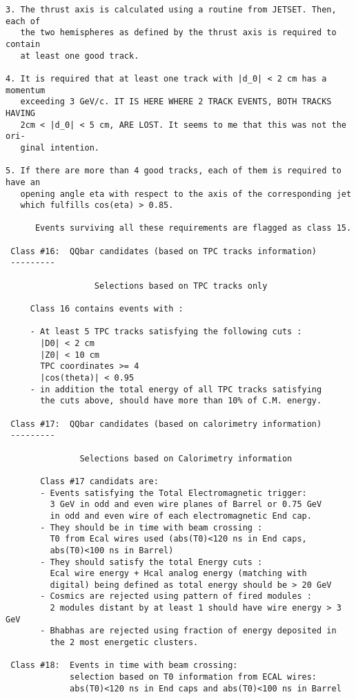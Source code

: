\begin{verbatim}
3. The thrust axis is calculated using a routine from JETSET. Then, each of
   the two hemispheres as defined by the thrust axis is required to contain
   at least one good track.
 
4. It is required that at least one track with |d_0| < 2 cm has a momentum
   exceeding 3 GeV/c. IT IS HERE WHERE 2 TRACK EVENTS, BOTH TRACKS HAVING
   2cm < |d_0| < 5 cm, ARE LOST. It seems to me that this was not the ori-
   ginal intention.
 
5. If there are more than 4 good tracks, each of them is required to have an
   opening angle eta with respect to the axis of the corresponding jet
   which fulfills cos(eta) > 0.85.
 
      Events surviving all these requirements are flagged as class 15.
 
 Class #16:  QQbar candidates (based on TPC tracks information)
 ---------
 
                  Selections based on TPC tracks only
 
     Class 16 contains events with :
 
     - At least 5 TPC tracks satisfying the following cuts :
       |D0| < 2 cm
       |Z0| < 10 cm
       TPC coordinates >= 4
       |cos(theta)| < 0.95
     - in addition the total energy of all TPC tracks satisfying
       the cuts above, should have more than 10% of C.M. energy.
 
 Class #17:  QQbar candidates (based on calorimetry information)
 ---------
 
               Selections based on Calorimetry information
 
       Class #17 candidats are:
       - Events satisfying the Total Electromagnetic trigger:
         3 GeV in odd and even wire planes of Barrel or 0.75 GeV
         in odd and even wire of each electromagnetic End cap.
       - They should be in time with beam crossing :
         T0 from Ecal wires used (abs(T0)<120 ns in End caps,
         abs(T0)<100 ns in Barrel)
       - They should satisfy the total Energy cuts :
         Ecal wire energy + Hcal analog energy (matching with
         digital) being defined as total energy should be > 20 GeV
       - Cosmics are rejected using pattern of fired modules :
         2 modules distant by at least 1 should have wire energy > 3 GeV
       - Bhabhas are rejected using fraction of energy deposited in
         the 2 most energetic clusters.
 
 Class #18:  Events in time with beam crossing:
             selection based on T0 information from ECAL wires:
             abs(T0)<120 ns in End caps and abs(T0)<100 ns in Barrel
 

\end{verbatim}
